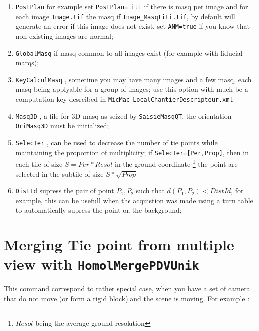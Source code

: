 \begin{enumerate}
    \item {\tt PostPlan} for example set {\tt PostPlan=titi} if there is masq per image and for each image 
          {\tt Image.tif} the masq if {\tt Image\_Masqtiti.tif}, by default will generate an error if this
          image does not exist, set {\tt ANM=true} if you know that non existing images are normal;

    \item {\tt GlobalMasq} if masq common to all images exist (for example with fiducial marqs);

    \item {\tt KeyCalculMasq} , sometime you may have many images and a few masq, each masq being applyable
          for a group of images; use this option with much be a computation key desrcibed in
          {\tt MicMac-LocalChantierDescripteur.xml}

    \item {\tt Masq3D} , a file for 3D masq as seized by {\tt SaisieMasqQT}, the orientation {\tt OriMasq3D} 
          must be initialized;

    \item {\tt SelecTer} , can be used to decrease the number of tie points while maintaining the proportion
          of multiplicity;  if {\tt SelecTer=[Per,Prop]}, then in each tile of size $S=Per*Resol$  in the ground coordinate
          \footnote{$Resol$ being the average ground resolution} the point are selected in the subtile of 
          size $S * \sqrt{Prop}$
    
    \item {\tt DistId} supress the pair of point $P_1,P_2$ such that $d(P_1,P_2)<DistId$, for example,
          this can be usefull when the acquistion was made using a turn table to automatically supress the
          point on the background;
    
\end{enumerate}




\section{Merging Tie point from multiple view with {\tt HomolMergePDVUnik}}

This command correspond to rather special case, when you have a set of camera that do not move (or form a rigid block) and the scene is moving.
For example :

